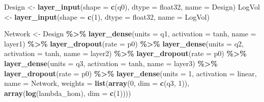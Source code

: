 \documentclass[
]{article}
\newenvironment{Shaded}{\begin{snugshade}}{\end{snugshade}}
\newcommand{\AttributeTok}[1]{\textcolor[rgb]{0.13,0.29,0.53}{#1}}
\newcommand{\DecValTok}[1]{\textcolor[rgb]{0.00,0.00,0.81}{#1}}
\newcommand{\FunctionTok}[1]{\textcolor[rgb]{0.13,0.29,0.53}{\textbf{#1}}}
\newcommand{\NormalTok}[1]{#1}
\newcommand{\OtherTok}[1]{\textcolor[rgb]{0.56,0.35,0.01}{#1}}
\newcommand{\SpecialCharTok}[1]{\textcolor[rgb]{0.81,0.36,0.00}{\textbf{#1}}}
\newcommand{\StringTok}[1]{\textcolor[rgb]{0.31,0.60,0.02}{#1}}
\begin{document}
\begin{Shaded}
\begin{Highlighting}[]
\NormalTok{Design }\OtherTok{\textless{}{-}} \FunctionTok{layer\_input}\NormalTok{(}\AttributeTok{shape =} \FunctionTok{c}\NormalTok{(q0), }\AttributeTok{dtype =} \StringTok{\textquotesingle{}float32\textquotesingle{}}\NormalTok{, }\AttributeTok{name =} \StringTok{\textquotesingle{}Design\textquotesingle{}}\NormalTok{)}
\NormalTok{LogVol }\OtherTok{\textless{}{-}} \FunctionTok{layer\_input}\NormalTok{(}\AttributeTok{shape =} \FunctionTok{c}\NormalTok{(}\DecValTok{1}\NormalTok{), }\AttributeTok{dtype =} \StringTok{\textquotesingle{}float32\textquotesingle{}}\NormalTok{, }\AttributeTok{name =} \StringTok{\textquotesingle{}LogVol\textquotesingle{}}\NormalTok{)}

\NormalTok{Network }\OtherTok{\textless{}{-}}\NormalTok{ Design }\SpecialCharTok{\%\textgreater{}\%}
  \FunctionTok{layer\_dense}\NormalTok{(}\AttributeTok{units =}\NormalTok{ q1, }\AttributeTok{activation =} \StringTok{\textquotesingle{}tanh\textquotesingle{}}\NormalTok{, }\AttributeTok{name =} \StringTok{\textquotesingle{}layer1\textquotesingle{}}\NormalTok{) }\SpecialCharTok{\%\textgreater{}\%}
  \FunctionTok{layer\_dropout}\NormalTok{(}\AttributeTok{rate =}\NormalTok{ p0) }\SpecialCharTok{\%\textgreater{}\%}
  \FunctionTok{layer\_dense}\NormalTok{(}\AttributeTok{units =}\NormalTok{ q2, }\AttributeTok{activation =} \StringTok{\textquotesingle{}tanh\textquotesingle{}}\NormalTok{, }\AttributeTok{name =} \StringTok{\textquotesingle{}layer2\textquotesingle{}}\NormalTok{) }\SpecialCharTok{\%\textgreater{}\%}
  \FunctionTok{layer\_dropout}\NormalTok{(}\AttributeTok{rate =}\NormalTok{ p0) }\SpecialCharTok{\%\textgreater{}\%}
  \FunctionTok{layer\_dense}\NormalTok{(}\AttributeTok{units =}\NormalTok{ q3, }\AttributeTok{activation =} \StringTok{\textquotesingle{}tanh\textquotesingle{}}\NormalTok{, }\AttributeTok{name =} \StringTok{\textquotesingle{}layer3\textquotesingle{}}\NormalTok{) }\SpecialCharTok{\%\textgreater{}\%}
  \FunctionTok{layer\_dropout}\NormalTok{(}\AttributeTok{rate =}\NormalTok{ p0) }\SpecialCharTok{\%\textgreater{}\%}
  \FunctionTok{layer\_dense}\NormalTok{(}\AttributeTok{units =} \DecValTok{1}\NormalTok{, }\AttributeTok{activation =} \StringTok{\textquotesingle{}linear\textquotesingle{}}\NormalTok{, }\AttributeTok{name =} \StringTok{\textquotesingle{}Network\textquotesingle{}}\NormalTok{, }
              \AttributeTok{weights =} \FunctionTok{list}\NormalTok{(}\FunctionTok{array}\NormalTok{(}\DecValTok{0}\NormalTok{, }\AttributeTok{dim =} \FunctionTok{c}\NormalTok{(q3, }\DecValTok{1}\NormalTok{)), }\FunctionTok{array}\NormalTok{(}\FunctionTok{log}\NormalTok{(lambda\_hom), }\AttributeTok{dim =} \FunctionTok{c}\NormalTok{(}\DecValTok{1}\NormalTok{))))}


\end{Highlighting}
\end{Shaded}
\end{document}
